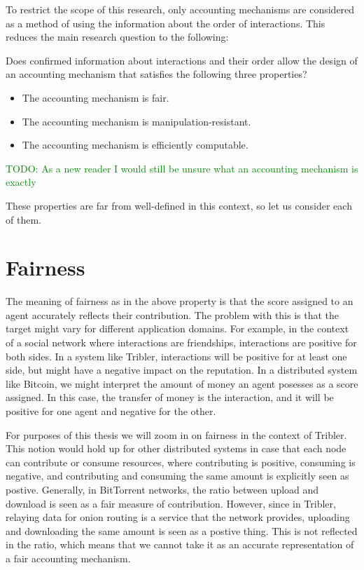 \documentclass[a4paper,11pt]{book}
\newcommand\suggestion[1]{\textcolor{green}{TODO: #1}}
\theoremstyle{definition}
\begin{document}
To restrict the scope of this research, only accounting mechanisms are considered as a method
of using the information about the order of interactions. This reduces the main research question
to the following:

\begin{center}
    Does confirmed information about interactions and their order allow the design of an accounting mechanism
    that satisfies the following three properties?
\end{center}

\begin{itemize}
    \item The accounting mechanism is fair. 
    \item The accounting mechanism is manipulation-resistant.
    \item The accounting mechanism is efficiently computable.
\end{itemize}

\suggestion{As a new reader I would still be unsure what an accounting mechanism is exactly}

These properties are far from well-defined in this context, so let us consider each of them.

\section{Fairness}

The meaning of fairness as in the above property is that the score assigned to an agent
accurately reflects their contribution. The problem with this is that the target might
vary for different application domains. For example, in the context of a social
network where interactions are friendships, interactions are positive for both sides.
In a system like Tribler, interactions will be positive for at least one side, but
might have a negative impact on the reputation. In a distributed system like Bitcoin,
we might interpret the amount of money an agent posesses as a score assigned. In
this case, the transfer of money is the interaction, and it will be positive for one
agent and negative for the other.

For purposes of this thesis we will zoom in on fairness in the context of Tribler.
This notion would hold up for other distributed systems in case that each node
can contribute or consume resources, where contributing is positive, consuming
is negative, and contributing and consuming the same amount is explicitly seen as postive.
Generally, in BitTorrent networks, the ratio between upload and download is seen
as a fair measure of contribution. However, since in Tribler, relaying data for onion
routing is a service that the network provides, uploading and downloading the same
amount is seen as a postive thing. This is not reflected in the ratio, which
means that we cannot take it as an accurate representation of a fair accounting mechanism.
\end{document}
